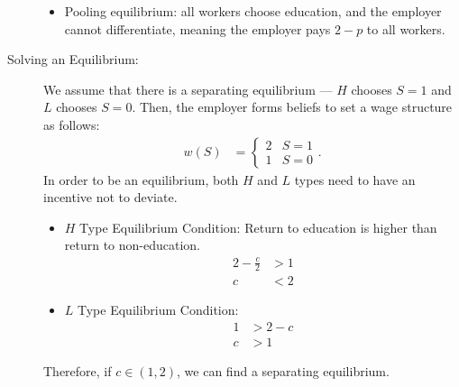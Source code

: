 \documentclass[10pt]{extarticle}
\begin{document}
\begin{description}
\begin{itemize}
        \item Pooling equilibrium: all workers choose education, and the employer cannot differentiate, meaning the employer pays $2-p$ to all workers.
      \end{itemize}
    \item[Solving an Equilibrium:] We assume that there is a separating equilibrium --- $H$ chooses $S=1$ and $L$ chooses $S=0$. Then, the employer forms beliefs to set a wage structure as follows:
      \begin{align*}
        w(S) &= \begin{cases}
          2 & S=1\\
          1 & S=0
        \end{cases}.
      \end{align*}
      In order to be an equilibrium, both $H$ and $L$ types need to have an incentive not to deviate.
      \begin{itemize}
        \item $H$ Type Equilibrium Condition: Return to education is higher than return to non-education.
          \begin{align*}
            2 - \frac{c}{2} &> 1\\
            c &< 2
          \end{align*}
        \item $L$ Type Equilibrium Condition:
          \begin{align*}
            1 &> 2-c\\
            c &> 1
          \end{align*}
      \end{itemize}
      Therefore, if $c\in (1,2)$, we can find a separating equilibrium.
  \end{description}
\end{document}
